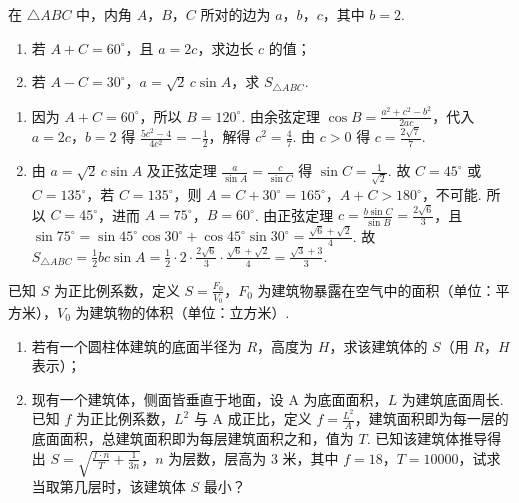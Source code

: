 \begin{problem}
在 \(\triangle ABC\) 中，内角 \(A\)，\(B\)，\(C\) 所对的边为 \(a\)，\(b\)，\(c\)，其中 \(b=2\).

\begin{enumerate}
\item 若 \(A+C=60^\circ\)，且 \(a=2c\)，求边长 \(c\) 的值；
\item 若 \(A-C=30^\circ\)，\(a=\sqrt2\,c\sin A\)，求 \(S_{\triangle ABC}\).
\end{enumerate}
\end{problem}

\begin{solution}
\begin{enumerate}
\item 因为 \(A+C=60^\circ\)，所以 \(B=120^\circ\). 由余弦定理 \(\cos B=\frac{a^2+c^2-b^2}{2ac}\)，代入 \(a=2c\)，\(b=2\) 得 \(\frac{5c^2-4}{4c^2}=-\frac{1}{2}\)，解得 \(c^2=\frac{4}{7}\). 由 \(c>0\) 得 \(c=\frac{2\sqrt7}{7}\).
\item 由 \(a=\sqrt2\,c\sin A\) 及正弦定理 \(\frac{a}{\sin A}=\frac{c}{\sin C}\) 得 \(\sin C=\frac{1}{\sqrt2}\). 故 \(C=45^\circ\) 或 \(C=135^\circ\)，若 \(C=135^\circ\)，则 \(A=C+30^\circ=165^\circ\)，\(A+C>180^\circ\)，不可能. 所以 \(C=45^\circ\)，进而 \(A=75^\circ\)，\(B=60^\circ\). 由正弦定理 \(c=\frac{b\sin C}{\sin B}=\frac{2\sqrt6}{3}\)，且 \(\sin75^\circ=\sin45^\circ\cos30^\circ+\cos45^\circ\sin30^\circ=\frac{\sqrt6+\sqrt2}{4}\). 故 \(S_{\triangle ABC}=\frac{1}{2}bc\sin A=\frac{1}{2}\cdot 2\cdot\frac{2\sqrt6}{3}\cdot\frac{\sqrt6+\sqrt2}{4}=\frac{\sqrt3+3}{3}\).
\end{enumerate}
\end{solution}

\begin{problem}
已知 \(S\) 为正比例系数，定义 \(S=\frac{F_0}{V_0}\)，\(F_0\) 为建筑物暴露在空气中的面积（单位：平方米），\(V_0\) 为建筑物的体积（单位：立方米）.

\begin{enumerate}
\item 若有一个圆柱体建筑的底面半径为 \(R\)，高度为 \(H\)，求该建筑体的 \(S\)（用 \(R\)，\(H\) 表示）；
\item 现有一个建筑体，侧面皆垂直于地面，设 A 为底面面积，\(L\) 为建筑底面周长. 已知 \(f\) 为正比例系数，\(L^2\) 与 A 成正比，定义 \(f=\frac{L^2}{A}\)，建筑面积即为每一层的底面面积，总建筑面积即为每层建筑面积之和，值为 \(T\). 已知该建筑体推导得出 \(S=\sqrt{\frac{f\cdot n}{T}+\frac{1}{3n}}\)，\(n\) 为层数，层高为 \(3\) 米，其中 \(f=18\)，\(T=10000\)，试求当取第几层时，该建筑体 \(S\) 最小？
\end{enumerate}
\end{problem}

